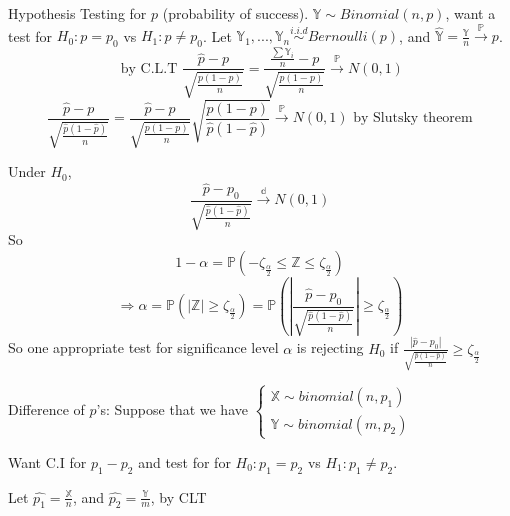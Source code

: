 Hypothesis Testing for $p$ (probability of success). $\mathbb{Y} \sim Binomial(n, p)$, want a test for $H_0: p = p_0$ vs $H_1: p \neq p_0$. 
Let $\mathbb{Y}_1, ..., \mathbb{Y}_n \overset{i.i.d}{\sim} Bernoulli(p)$, and $\hat{\mathbb{Y}} = \frac{\mathbb{Y}}{n} \overset{\mathbb{P}}{\to} p$.
$$\text{ by C.L.T  } \frac{\hat{p} - p}{\sqrt{\frac{p(1-p)}{n}} } =  \frac{\frac{\sum \mathbb{Y}_i}{n} - p}{\sqrt{\frac{p(1-p)}{n}} } \overset{\mathbb{P}}{\to} N(0, 1)$$
$$\frac{\hat{p} - p}{\sqrt{\frac{\hat{p}(1-\hat{p})}{n}} } = \frac{\hat{p} - p}{\sqrt{\frac{p(1-p)}{n}} } \sqrt{\frac{p(1-p)}{\hat{p}(1-\hat{p})}} \overset{\mathbb{P}}{\to} N(0, 1) \text{ by Slutsky theorem}$$

Under $H_0$, 
$$\frac{\hat{p} - p_0}{\sqrt{\frac{\hat{p}(1-\hat{p})}{n}} } \overset{\mathbb{d}}{\to} N(0, 1) $$
So
$$1-\alpha = \mathbb{P}(-\zeta_{\frac{\alpha}{2}} \leq \mathbb{Z} \leq \zeta_{\frac{\alpha}{2}})$$
$$\Rightarrow \alpha = \mathbb{P} (|\mathbb{Z}| \geq \zeta_{\frac{\alpha}{2}})
= \mathbb{P} ( |\frac{\hat{p} - p_0}{\sqrt{\frac{\hat{p}(1-\hat{p})}{n}} }| \geq \zeta_{\frac{\alpha}{2}} )$$
So one appropriate test for significance level $\alpha$ is rejecting $H_0$ if $ \frac{|\hat{p} - p_0|}{\sqrt{\frac{\hat{p}(1-\hat{p})}{n}} } \geq \zeta_{\frac{\alpha}{2}}$

Difference of $p$'s: Suppose that we have $\begin{cases}
\mathbb{X} \sim binomial(n, p_1) \\
\mathbb{Y} \sim binomial(m, p_2)
\end{cases}$

Want C.I for $p_1 - p_2$ and test for for $H_0: p_1 = p_2$ vs $H_1: p_1 \neq p_2$.

Let $\hat{p_1} = \frac{\mathbb{X}}{n}$, and $\hat{p_2} = \frac{\mathbb{Y}}{m}$, by CLT

